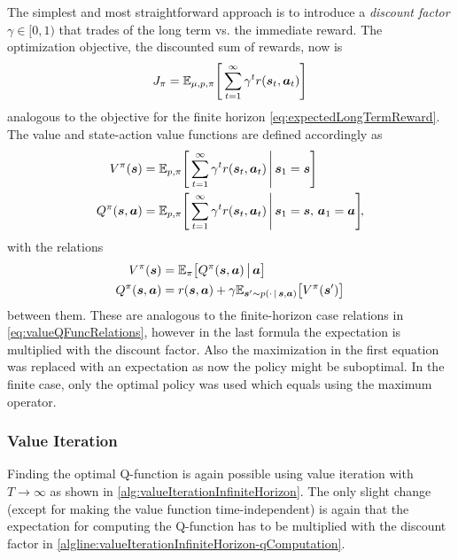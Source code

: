 			The simplest and most straightforward approach is to introduce a \emph{discount factor} \( \gamma \in [0, 1) \) that trades of the long term vs. the immediate reward. The optimization objective, the discounted sum of rewards, now is
			\begin{equation*}
				J_\pi = \mathbb{E}_{\mu, p, \pi} \Bigg[ \sum_{t = 1}^{\infty} \gamma^t r(\bm{s}_t, \bm{a}_t) \Bigg]  \label{eq:expectedDiscountedLongTermReward}
			\end{equation*}
			analogous to the objective for the finite horizon \eqref{eq:expectedLongTermReward}. The value and state-action value functions are defined accordingly as
			\begin{align*}
				V^\pi(\bm{s}) &= \mathbb{E}_{p, \pi}\Bigg[ \sum_{t = 1}^{\infty} \gamma^t r(\bm{s}_t, \bm{a}_t) \,\Bigg\vert\, \bm{s}_1 = \bm{s} \Bigg] \\
				Q^\pi(\bm{s}, \bm{a}) &= \mathbb{E}_{p, \pi}\Bigg[ \sum_{t = 1}^{\infty} \gamma^t r(\bm{s}_t, \bm{a}_t) \,\Bigg\vert\, \bm{s}_1 = \bm{s},\, \bm{a}_1 = \bm{a} \Bigg]\!,
			\end{align*}
			with the relations
			\begin{align*}
				V^\pi(\bm{s}) &= \mathbb{E}_\pi\big[ Q^\pi(\bm{s}, \bm{a}) \,\big\vert\, \bm{a} \big] \\
				Q^\pi(\bm{s}, \bm{a}) &= r(\bm{s}, \bm{a}) + \gamma \mathbb{E}_{\bm{s}' \sim p(\cdot \,\vert\, \bm{s}, \bm{a})}\big[ V^\pi(\bm{s}') \big]
			\end{align*}
			between them. These are analogous to the finite-horizon case relations in \eqref{eq:valueQFuncRelations}, however in the last formula the expectation is multiplied with the discount factor. Also the maximization in the first equation was replaced with an expectation as now the policy might be suboptimal. In the finite case, only the optimal policy was used which equals using the maximum operator.

			\subsubsection{Value Iteration}
				Finding the optimal Q-function is again possible using value iteration with \( T \to \infty \) as shown in \autoref{alg:valueIterationInfiniteHorizon}. The only slight change (except for making the value function time-independent) is again that the expectation for computing the Q-function has to be multiplied with the discount factor in \autoref{algline:valueIterationInfiniteHorizon-qComputation}.

